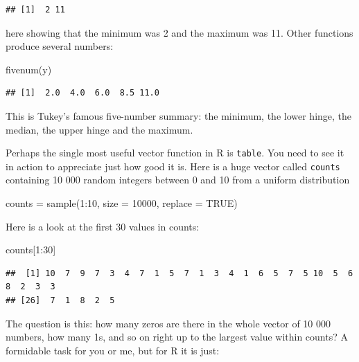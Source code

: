 \documentclass[
]{book}
\newenvironment{Shaded}{\begin{snugshade}}{\end{snugshade}}
\newcommand{\AttributeTok}[1]{\textcolor[rgb]{0.77,0.63,0.00}{#1}}
\newcommand{\ConstantTok}[1]{\textcolor[rgb]{0.00,0.00,0.00}{#1}}
\newcommand{\DecValTok}[1]{\textcolor[rgb]{0.00,0.00,0.81}{#1}}
\newcommand{\FunctionTok}[1]{\textcolor[rgb]{0.00,0.00,0.00}{#1}}
\newcommand{\NormalTok}[1]{#1}
\newcommand{\OtherTok}[1]{\textcolor[rgb]{0.56,0.35,0.01}{#1}}
\newcommand{\SpecialCharTok}[1]{\textcolor[rgb]{0.00,0.00,0.00}{#1}}
\begin{document}
\begin{verbatim}
## [1]  2 11
\end{verbatim}

here showing that the minimum was 2 and the maximum was 11. Other functions produce several numbers:

\begin{Shaded}
\begin{Highlighting}[]
\FunctionTok{fivenum}\NormalTok{(y)}
\end{Highlighting}
\end{Shaded}

\begin{verbatim}
## [1]  2.0  4.0  6.0  8.5 11.0
\end{verbatim}

This is Tukey's famous five-number summary: the minimum, the lower hinge, the median, the upper hinge and the maximum.

Perhaps the single most useful vector function in R is \texttt{table}. You need to see it in action to appreciate just how good it is. Here is a huge vector called \texttt{counts} containing 10 000 random integers between 0 and 10 from a uniform distribution

\begin{Shaded}
\begin{Highlighting}[]
\NormalTok{counts }\OtherTok{=} \FunctionTok{sample}\NormalTok{(}\DecValTok{1}\SpecialCharTok{:}\DecValTok{10}\NormalTok{, }\AttributeTok{size =} \DecValTok{10000}\NormalTok{, }\AttributeTok{replace =} \ConstantTok{TRUE}\NormalTok{)}
\end{Highlighting}
\end{Shaded}

Here is a look at the first 30 values in counts:

\begin{Shaded}
\begin{Highlighting}[]
\NormalTok{counts[}\DecValTok{1}\SpecialCharTok{:}\DecValTok{30}\NormalTok{]}
\end{Highlighting}
\end{Shaded}

\begin{verbatim}
##  [1] 10  7  9  7  3  4  7  1  5  7  1  3  4  1  6  5  7  5 10  5  6  8  2  3  3
## [26]  7  1  8  2  5
\end{verbatim}

The question is this: how many zeros are there in the whole vector of 10 000 numbers, how many 1s, and so on right up to the largest value within counts? A formidable task for you or me, but for R it is just:
\end{document}
